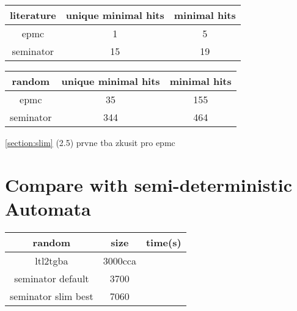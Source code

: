 \documentclass[
	digital
nolof, nolot
]{fithesis3}
\newcommand{\hlineny}{\hline}
\begin{document}
\begin{center}
	\begin{tabular}{ |c|c|c| } 
		\hline
		literature&unique minimal hits&minimal hits\\
		\hline
		epmc&1 & 5\\
		\hline
		seminator &15 & 19\\ 
		\hline
	\end{tabular}
\end{center}
		\begin{center}
			\begin{tabular}{ |c|c|c| } 
				\hline
				random&unique minimal hits&minimal hits\\
				\hline
				epmc&35 & 155\\
				\hline
				seminator &344 & 464\\ 
				\hline
			\end{tabular}
		\end{center}
		
		
		\ref{section:slim}
		(2.5)
		prvne tba zkusit pro epmc
		\section{Compare with semi-deterministic Automata}
			\begin{center}
			\begin{tabular}{ |c|c|c| } 
				\hline
				random&size&time(s)\\
				\hline
				ltl2tgba&3000cca & \\
				\hline
				seminator default &3700 & \\
				\hlineny
				seminator slim best &7060 & \\ 
				\hlineny
			\end{tabular}
		\end{center}
\end{document}
